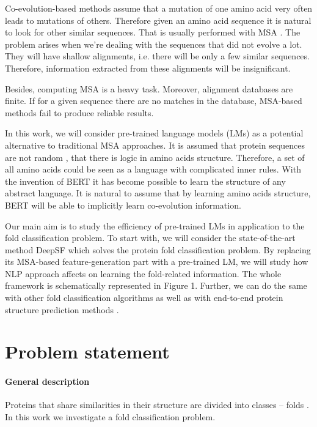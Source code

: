 \documentclass[12pt, twoside]{article}
\begin{document}
 Co-evolution-based methods assume that a mutation of one amino acid very often leads to mutations of others. Therefore given an amino acid sequence it is natural to look for other similar sequences. That is usually performed with MSA \cite{co-evolution}. The problem arises when we’re dealing with the sequences that did not evolve a lot. They will have shallow alignments, i.e. there will be only a few similar sequences. Therefore, information extracted from these alignments will be insignificant. 

Besides, computing MSA is a heavy task. Moreover, alignment databases are finite. If for a given sequence there are no matches in the database, MSA-based methods fail to produce reliable results. 

In this work, we will consider pre-trained language models (LMs)  \cite{Elnaggar} as a potential alternative to traditional MSA approaches. It is assumed that protein sequences are not random \cite{evolution-not-random}, that there is logic in amino acids structure. Therefore, a set of all amino acids could be seen as a language with complicated inner rules. With the invention of BERT \cite{bert} it has become possible to learn the structure of any abstract language. It is natural to assume that by learning amino acids structure, BERT will be able to implicitly learn co-evolution information.

Our main aim is to study the efficiency of pre-trained LMs in application to the fold classification problem.  To start with, we will consider the state-of-the-art method DeepSF \cite{DeepSF} which solves the protein fold classification problem.  By replacing its MSA-based feature-generation part with a pre-trained LM, we will study how NLP approach affects on learning the fold-related information.  The whole framework is schematically represented in Figure 1. Further, we can do the same with other fold classification algorithms \cite{Villegas, DeepFrag}
as well as with end-to-end protein structure prediction methods \cite{Kandathil, Xu2020.10.12.336859}.



\section{Problem statement}
\paragraph{General description}
\noindent
Proteins that share similarities in their structure are  divided into classes -- folds \cite{Schaeffer2011}. In this work we investigate a fold classification problem.  
\end{document}
